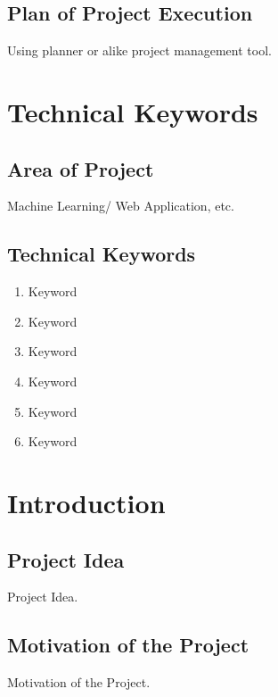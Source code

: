 \documentclass{report} %
\begin{document}
		\section{Plan of Project Execution}
		Using planner or alike project management tool.
		\pagebreak

		
	\chapter{Technical Keywords}
	\pagebreak	
		\section{Area of Project}
		Machine Learning/ Web Application, etc.
		
		\section{Technical Keywords}
		\begin{enumerate}
			\item Keyword 
			\item Keyword 
			\item Keyword 
			\item Keyword 
			\item Keyword 
			\item Keyword 
		\end{enumerate}
		\pagebreak

	
	\chapter{Introduction}
	\pagebreak	
		\section{Project Idea}
		Project Idea.
		
		\section{Motivation of the Project}
		Motivation of the Project.
		
\end{document}
